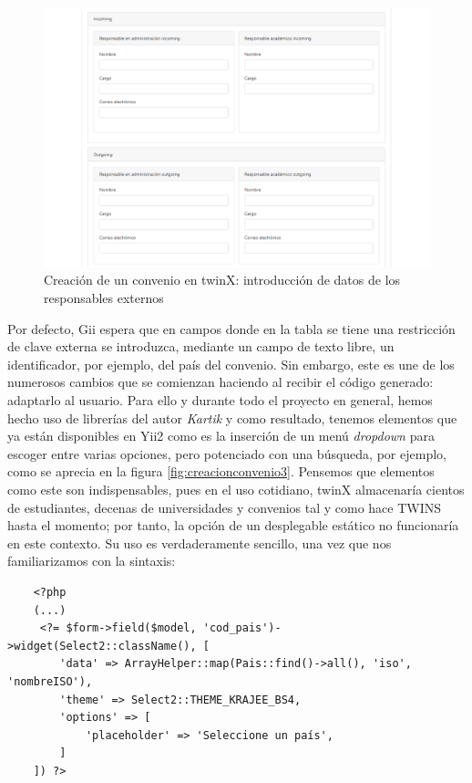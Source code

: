 \begin{figure}
	\centering
	\includegraphics[width=\textwidth]{img/Capturas de twinX/creacion_convenio_2}
	\caption[Creación de un convenio en twinX 2]{Creación de un convenio en twinX: introducción de datos de los responsables externos}
	\label{fig:creacionconvenio2}
\end{figure}

Por defecto, Gii espera que en campos donde en la tabla se tiene una restricción de clave externa se introduzca, mediante un campo de texto libre, un identificador, por ejemplo, del país del convenio. Sin embargo, este es une de los numerosos cambios que se comienzan haciendo al recibir el código generado: adaptarlo al usuario. Para ello y durante todo el proyecto en general, hemos hecho uso de librerías del autor \textit{Kartik} \cite{krajee} y como resultado, tenemos elementos que ya están disponibles en Yii2 como es la inserción de un menú \textit{dropdown} para escoger entre varias opciones, pero potenciado con una búsqueda, por ejemplo, como se aprecia en la figura \ref{fig:creacionconvenio3}. Pensemos que elementos como este son indispensables, pues en el uso cotidiano, twinX almacenaría cientos de estudiantes, decenas de universidades y convenios tal y como hace TWINS hasta el momento; por tanto, la opción de un desplegable estático no funcionaría en este contexto. Su uso es verdaderamente sencillo, una vez que nos familiarizamos con la sintaxis:

\begin{verbatim}
	<?php
	(...)	
	 <?= $form->field($model, 'cod_pais')->widget(Select2::className(), [
		'data' => ArrayHelper::map(Pais::find()->all(), 'iso', 'nombreISO'),
		'theme' => Select2::THEME_KRAJEE_BS4,
		'options' => [
			'placeholder' => 'Seleccione un país',
		]
	]) ?>
	
\end{verbatim}


